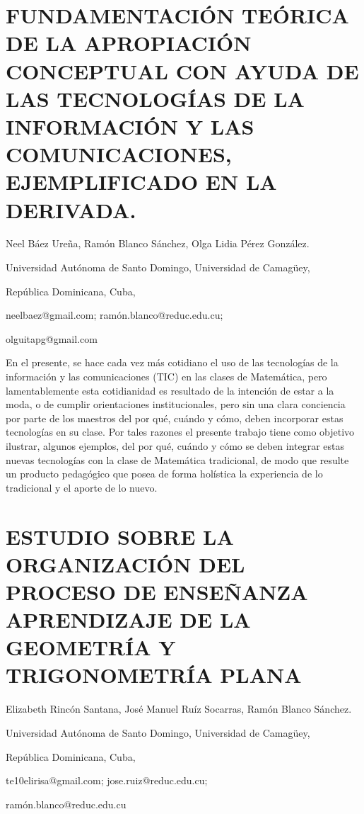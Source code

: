 \section{FUNDAMENTACIÓN TEÓRICA DE LA APROPIACIÓN CONCEPTUAL CON AYUDA DE
LAS TECNOLOGÍAS DE LA INFORMACIÓN Y LAS COMUNICACIONES, EJEMPLIFICADO
EN LA DERIVADA. }

\begin{datos}

Neel Báez Ureña, Ramón Blanco Sánchez, Olga Lidia Pérez González.

Universidad Autónoma de Santo Domingo, Universidad de Camagüey,

República Dominicana, Cuba,

neelbaez@gmail.com; ramón.blanco@reduc.edu.cu;

olguitapg@gmail.com

\end{datos}

En el presente, se hace cada vez más cotidiano el uso de las tecnologías
de la información y las comunicaciones (TIC) en las clases de Matemática,
pero lamentablemente esta cotidianidad es resultado de la intención
de estar a la moda, o de cumplir orientaciones institucionales, pero
sin una clara conciencia por parte de los maestros del por qué, cuándo
y cómo, deben incorporar estas tecnologías en su clase. Por tales
razones el presente trabajo tiene como objetivo ilustrar, algunos
ejemplos, del por qué, cuándo y cómo se deben integrar estas nuevas
tecnologías con la clase de Matemática tradicional, de modo que resulte
un producto pedagógico que posea de forma holística la experiencia
de lo tradicional y el aporte de lo nuevo.


\section{ESTUDIO SOBRE LA ORGANIZACIÓN DEL PROCESO DE ENSEÑANZA APRENDIZAJE
DE LA GEOMETRÍA Y TRIGONOMETRÍA PLANA }

\begin{datos}

Elizabeth Rincón Santana, José Manuel Ruíz Socarras, Ramón Blanco
Sánchez.

Universidad Autónoma de Santo Domingo, Universidad de Camagüey,

República Dominicana, Cuba,

te10elirisa@gmail.com; jose.ruiz@reduc.edu.cu; 

ramón.blanco@reduc.edu.cu

\end{datos}

